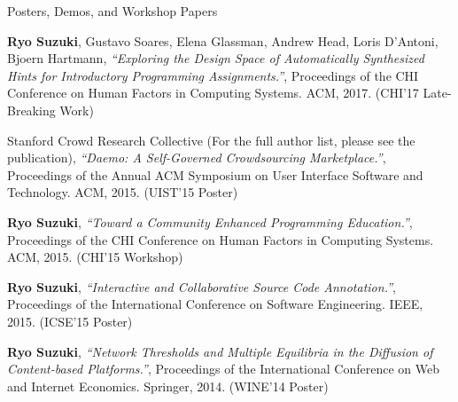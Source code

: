\documentclass{resume} %
\begin{document}


\begin{rSection}{Posters, Demos, and Workshop Papers}

{\bf Ryo Suzuki}, Gustavo Soares, Elena Glassman, Andrew Head, Loris D’Antoni, Bjoern Hartmann,
{\it ``Exploring the Design Space of Automatically Synthesized Hints for Introductory Programming Assignments.''},
Proceedings of the CHI Conference on Human Factors in Computing Systems. ACM, 2017. (CHI'17 Late-Breaking Work)

Stanford Crowd Research Collective (For the full author list, please see the publication), 
{\it ``Daemo: A Self-Governed Crowdsourcing Marketplace.''},
Proceedings of the Annual ACM Symposium on User Interface Software and Technology. ACM, 2015. (UIST'15 Poster)

{\bf Ryo Suzuki}, 
{\it ``Toward a Community Enhanced Programming Education.''}, 
Proceedings of the CHI Conference on Human Factors in Computing Systems. ACM, 2015. (CHI'15 Workshop)

{\bf Ryo Suzuki}, 
{\it ``Interactive and Collaborative Source Code Annotation.''}, 
Proceedings of the International Conference on Software Engineering. IEEE, 2015. (ICSE'15 Poster)

{\bf Ryo Suzuki}, 
{\it ``Network Thresholds and Multiple Equilibria in the Diffusion of Content-based Platforms.''},
Proceedings of the International Conference on Web and Internet Economics. Springer, 2014. (WINE'14 Poster)


\end{rSection}
\end{document}
